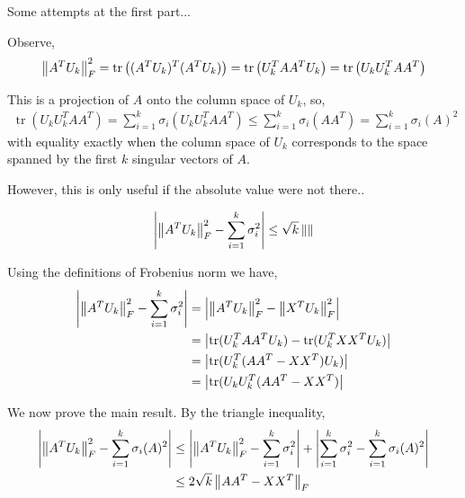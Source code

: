 \documentclass[10pt]{article}
\newcommand{\tr}{\operatorname{tr}}
\begin{document}
\begin{solution}[Solution]
\begin{enumerate}[label=(\alph*)]
        \hrulefill

        Some attempts at the first part...

        Observe,
        \begin{align*}
            \norm{A^TU_k}_F^2 
            = \tr \left( (A^TU_k)^T(A^TU_k) \right) 
            = \tr \left( U_k^TAA^TU_k \right)             
            = \tr \left( U_kU_k^TAA^T \right)
        \end{align*}
        
        This is a projection of \( A \) onto the column space of \( U_k \), so,
        \begin{align*}
            \tr \left( U_kU_k^TAA^T \right) = \sum_{i=1}^{k} \sigma_i(U_kU_k^TAA^T)
            \leq \sum_{i=1}^{k} \sigma_i(AA^T)
            = \sum_{i=1}^{k} \sigma_i(A)^2
        \end{align*}
        with equality exactly when the column space of \( U_k \) corresponds to the space spanned by the first \( k \) singular vectors of \( A \).

        However, this is only useful if the absolute value were not there..

        
        \begin{align*}
            \left| \left\lVert A^TU_k\right\rVert_F^2 - \sum_{i=1}^{k}\sigma_i^2 \right|
            \leq \sqrt{k} \left\lVert\right\rVert
        \end{align*}
        


        Using the definitions of Frobenius norm we have,
        \begin{align*}
            \left| \norm{A^TU_k}_F^2 - \sum_{i=1}^{k}\sigma_i^2 \right| 
            &= \left| \norm{A^TU_k}_F^2 - \norm{X^TU_k}_F^2 \right|
            \\&= \left| \tr( U_k^TAA^TU_k) - \tr(U_k^TXX^TU_k) \right|
            \\&= \left| \tr( U_k^T(AA^T-XX^T)U_k) \right|
            \\&= \left| \tr( U_kU_k^T(AA^T-XX^T) \right|
        \end{align*}
        

        \hrulefill

        We now prove the main result. By the triangle inequality,
        \begin{align*}
            \left| \left\lVert A^TU_k\right\rVert_F^2 - \sum_{i=1}^{k}\sigma_i(A)^2 \right| 
            &\leq \left| \left\lVert A^TU_k\right\rVert_F^2 - \sum_{i=1}^{k} \sigma_i^2 \right|  + \left| \sum_{i=1}^{k}\sigma_i^2 - \sum_{i=1}^{k}\sigma_i(A)^2 \right| 
            \\& \leq 2\sqrt{k} \left\lVert AA^T-XX^T\right\rVert_F
        \end{align*}
        

\end{enumerate}
\end{solution}
\end{document}
